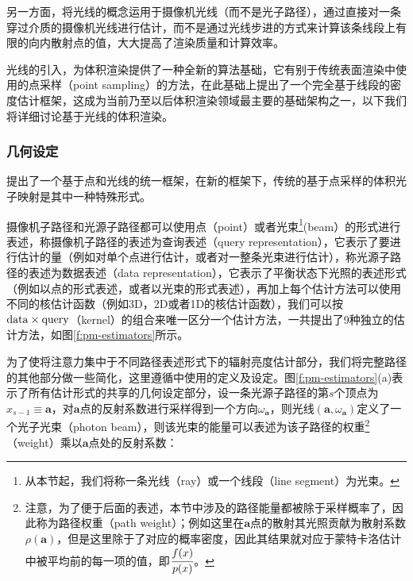 另一方面，\cite{a:TheBeamRadianceEstimateforVolumetricPhotonMapping}将光线的概念运用于摄像机光线（而不是光子路径），通过直接对一条穿过介质的摄像机光线进行估计，而不是通过光线步进的方式来计算该条线段上有限的向内散射点的值，大大提高了渲染质量和计算效率。

光线的引入，为体积渲染提供了一种全新的算法基础，它有别于传统表面渲染中使用的点采样（point sampling）的方法，\cite{a:AComprehensiveTheoryofVolumetricRadianceEstimationusingPhotonPointsandBeams}在此基础上提出了一个完全基于线段的密度估计框架，这成为当前乃至以后体积渲染领域最主要的基础架构之一，以下我们将详细讨论基于光线的体积渲染。





\subsubsection{几何设定}
\cite{a:AComprehensiveTheoryofVolumetricRadianceEstimationusingPhotonPointsandBeams}提出了一个基于点和光线的统一框架，在新的框架下，传统的基于点采样的体积光子映射是其中一种特殊形式。

摄像机子路径和光源子路径都可以使用点（point）或者光束\footnote{从本节起，我们将称一条光线（ray）或一个线段（line segment）为光束。}(beam）的形式进行表述，称摄像机子路径的表述为查询表述（query representation），它表示了要进行估计的量（例如对单个点进行估计，或者对一整条光束进行估计），称光源子路径的表述为数据表述（data representation），它表示了平衡状态下光照的表述形式（例如以点的形式表述，或者以光束的形式表述），再加上每个估计方法可以使用不同的核估计函数（例如3D，2D或者1D的核估计函数），我们可以按${\rm data} \times {\rm query}$（kernel）的组合来唯一区分一个估计方法，\cite{a:AComprehensiveTheoryofVolumetricRadianceEstimationusingPhotonPointsandBeams}一共提出了9种独立的估计方法，如图\ref{f:pm-estimators}所示。

为了使将注意力集中于不同路径表述形式下的辐射亮度估计部分，我们将完整路径的其他部分做一些简化，这里遵循\cite{a:UnifyingPointsBeamsandPathsinVolumetricLightTransportSimulation}中使用的定义及设定。图\ref{f:pm-estimators}(a)表示了所有估计形式的共享的几何设定部分，设一条光源子路径的第$s$个顶点为$x_{s-1}\equiv \mathbf{a}$，对$\mathbf{a}$点的反射系数进行采样得到一个方向$\omega_{\mathbf{a}}$，则光线$(\mathbf{a},\omega_{\mathbf{a}})$定义了一个光子光束（photon beam），则该光束的能量可以表述为该子路径的权重\footnote{注意，为了便于后面的表述，本节中涉及的路径能量都被除于采样概率了，因此称为路径权重（path weight）；例如这里在$\mathbf{a}$点的散射其光照贡献为散射系数$\rho(\mathbf{a})$，但是这里除于了对应的概率密度，因此其结果就对应于蒙特卡洛估计中被平均前的每一项的值，即$ \cfrac{f(x)}{p(x)}$。}（weight）乘以$\mathbf{a}$点处的反射系数：

